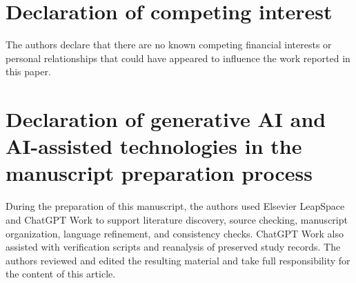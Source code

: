 \documentclass[a4paper,fleqn]{cas-dc}
\begin{document}
\section*{Declaration of competing interest}
The authors declare that there are no known competing financial interests or personal relationships that could have appeared to influence the work reported in this paper.

\section*{Declaration of generative AI and AI-assisted technologies in the manuscript preparation process}
During the preparation of this manuscript, the authors used Elsevier LeapSpace and ChatGPT Work to support literature discovery, source checking, manuscript organization, language refinement, and consistency checks. ChatGPT Work also assisted with verification scripts and reanalysis of preserved study records. The authors reviewed and edited the resulting material and take full responsibility for the content of this article.



\end{document}
